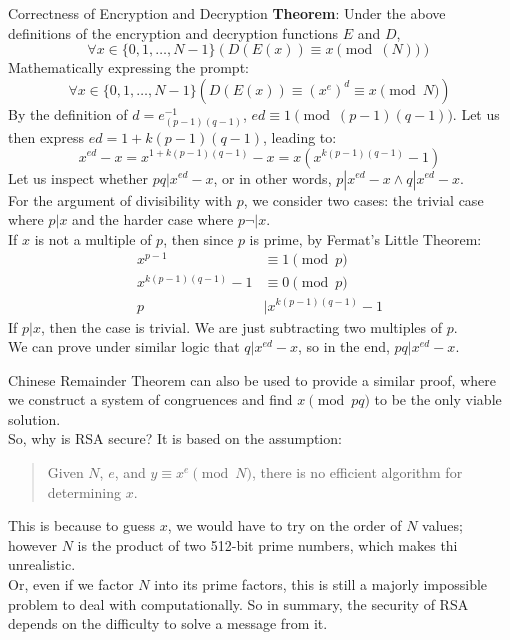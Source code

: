 \begin{ln-theorem}{Correctness of Encryption and Decryption}{}
    \textbf{Theorem}: Under the above definitions of the encryption and decryption functions $E$ and $D$,
    \[\forall x \in \{0, 1, \dots, N - 1\} (D(E(x)) \equiv x\pmod(N))\]
    \tcblower
    Mathematically expressing the prompt:
    \[\forall x \in \{0, 1, \dots, N - 1\} (D(E(x)) \equiv {(x^e)}^d \equiv x\pmod{N})\]
    By the definition of $d = {e}_{(p - 1)(q - 1)}^{-1}$, $ed \equiv 1\pmod{(p - 1)(q - 1)}$. Let us then express $ed = 1 + k(p - 1)(q - 1)$, leading to:
    \[x^{ed} - x = x^{1 + k(p - 1)(q - 1)} - x = x(x^{k(p - 1)(q - 1)} - 1)\]
    Let us inspect whether $pq | x^{ed} - x$, or in other words, $p | x^{ed} - x \land q | x^{ed} - x$. \\
    For the argument of divisibility with $p$, we consider two cases: the trivial case where $p | x$ and the harder case where $p \neg| x$. \\
    If $x$ is not a multiple of $p$, then since $p$ is prime, by Fermat's Little Theorem:
    \begin{align*}
        x^{p - 1} &\equiv 1\pmod{p} \\
        x^{k(p - 1)(q - 1)} - 1 &\equiv 0\pmod{p} \\
        p &| x^{k(p - 1)(q - 1)} - 1
    \end{align*}
    If $p | x$, then the case is trivial. We are just subtracting two multiples of $p$. \\
    We can prove under similar logic that $q | x^{ed} - x$, so in the end, $pq | x^{ed} - x$. \\
\end{ln-theorem}
Chinese Remainder Theorem can also be used to provide a similar proof, where we construct a system of congruences and find $x\pmod{pq}$ to be the only viable solution. \\
So, why is RSA secure? It is based on the assumption:
\begin{quote}
    Given $N$, $e$, and $y \equiv x^e \pmod{N}$, there is no efficient algorithm for determining $x$.
\end{quote}
This is because to guess $x$, we would have to try on the order of $N$ values; however $N$ is the product of two 512-bit prime numbers, which makes thi unrealistic. \\
Or, even if we factor $N$ into its prime factors, this is still a majorly impossible problem to deal with computationally.
So in summary, the security of RSA depends on the difficulty to solve a message from it. \\

